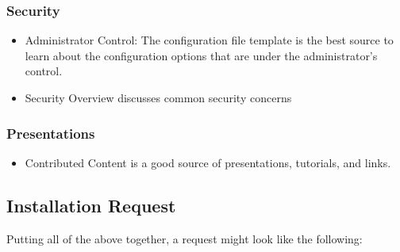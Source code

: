 \documentclass[letterpaper,10pt,english]{sphinxmanual}
\begin{document}
\subsubsection{Security}
\label{\detokenize{installation:security}}\begin{itemize}
\item {} 
Administrator Control: The configuration file template is the best source to learn about the configuration options that are under the administrator’s control.

\item {} 
Security Overview discusses common security concerns

\end{itemize}


\subsubsection{Presentations}
\label{\detokenize{installation:presentations}}\begin{itemize}
\item {} 
Contributed Content is a good source of presentations, tutorials, and links.

\end{itemize}


\subsection{Installation Request}
\label{\detokenize{installation:installation-request}}\label{\detokenize{installation:id6}}
Putting all of the above together, a request might look like the following:
\end{document}
